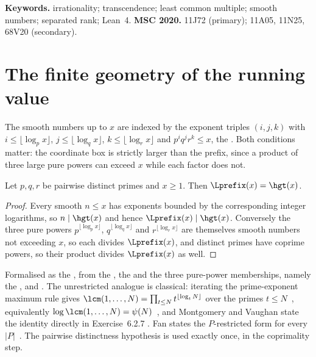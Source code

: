 \medskip
\noindent\textbf{Keywords.} irrationality; transcendence; least common
multiple; smooth numbers; separated rank; Lean~4.
\qquad
\textbf{MSC 2020.} 11J72 (primary); 11A05, 11N25, 68V20 (secondary).

\section{The finite geometry of the running value}\label{long269:sec:lcm}

The smooth numbers up to $x$ are indexed by the exponent triples $(i,j,k)$ with
$i\le\lfloor\log_p x\rfloor$, $j\le\lfloor\log_q x\rfloor$,
$k\le\lfloor\log_r x\rfloor$ and $p^{i}q^{j}r^{k}\le x$, the
.  Both conditions matter: the coordinate box is strictly
larger than the prefix, since a product of three large pure powers can exceed
$x$ while each factor does not.

\begin{theorem}\label{long269:res:lcm}
Let $p,q,r$ be pairwise distinct primes and $x\ge1$.  Then
$\Lprefix(x)=\hgt(x)$.
\end{theorem}

\begin{proof}
Every smooth $n\le x$ has exponents bounded by the corresponding integer
logarithms, so $n\mid\hgt(x)$ and hence $\Lprefix(x)\mid\hgt(x)$.  Conversely
the three pure powers $p^{\lfloor\log_p x\rfloor}$,
$q^{\lfloor\log_q x\rfloor}$ and $r^{\lfloor\log_r x\rfloor}$ are themselves
smooth numbers not exceeding $x$, so each divides $\Lprefix(x)$, and distinct
primes have coprime powers, so their product divides $\Lprefix(x)$ as well.
\end{proof}

\noindent Formalised as the
, from the
, the
 and the three pure-power memberships, namely the
,
and
.
The unrestricted analogue is classical: iterating the prime-exponent maximum
rule gives $\lcm(1,\ldots,N)=\prod_{t\le N}t^{\lfloor\log_t N\rfloor}$ over the
primes $t\le N$~\cite[Ex.~1.21(a), p.~22]{apostol1976}, equivalently
$\log\lcm(1,\ldots,N)=\psi(N)$~\cite[\S4.2, p.~75]{apostol1976}, and
Montgomery and Vaughan state the identity directly in Exercise~6.2.7
\cite[p.~183]{montgomeryvaughan2007}.  Fan states the $P$-restricted form for
every $|P|$~\cite{fan2026comment}.  The pairwise distinctness hypothesis is
used exactly once, in the coprimality step.

